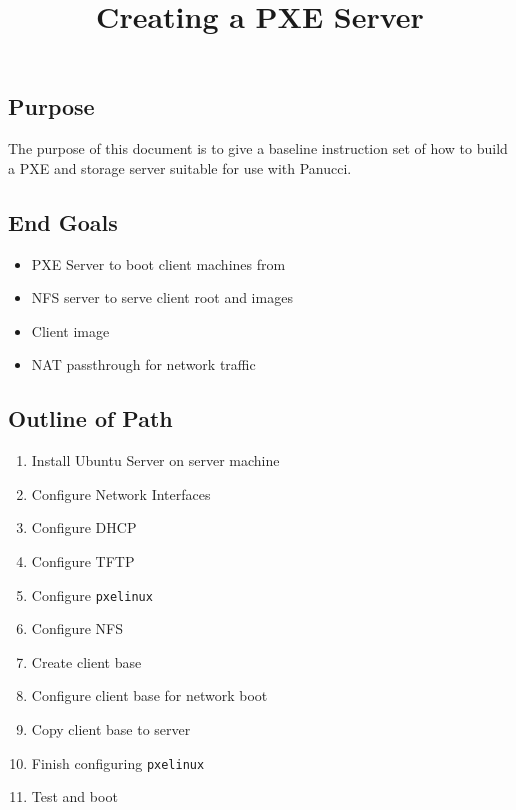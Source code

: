 \documentclass{article}
\begin{document}
\title{Creating a PXE Server}
\maketitle
\begin{flushleft}
  \pagebreak
\section{Purpose}
The purpose of this document is to give a baseline instruction set of how to build a PXE and storage server suitable for use with Panucci.
\subsection{End Goals}
\begin{itemize}
  \item PXE Server to boot client machines from
  \item NFS server to serve client root and images
  \item Client image
  \item NAT passthrough for network traffic
\end{itemize}
\subsection{Outline of Path}
\begin{enumerate}
  \item Install Ubuntu Server on server machine
  \item Configure Network Interfaces
  \item Configure DHCP
  \item Configure TFTP
  \item Configure \verb|pxelinux|
  \item Configure NFS
  \item Create client base
  \item Configure client base for network boot
  \item Copy client base to server
  \item Finish configuring \verb|pxelinux|
  \item Test and boot
\end{enumerate}
\
\end{flushleft}
\end{document}
